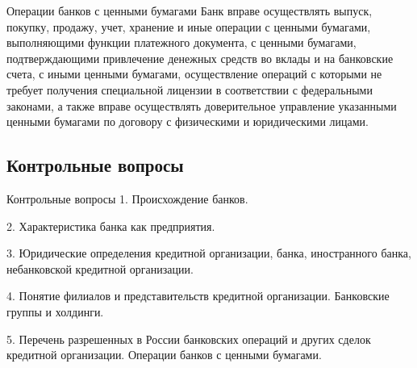 \documentclass[_Banking_p1.tex]{subfiles}
\begin{document}
\begin{frame}{Операции банков с ценными бумагами}
Банк вправе осуществлять выпуск, покупку, продажу, учет, хранение и иные операции с ценными бумагами, выполняющими функции платежного документа, с ценными бумагами, подтверждающими привлечение денежных средств во вклады и на банковские счета, с иными ценными бумагами, осуществление операций с которыми не требует получения специальной лицензии в соответствии с федеральными законами, а также вправе осуществлять доверительное управление указанными ценными бумагами по договору с физическими и юридическими лицами.

\end{frame}
\subsection{Контрольные вопросы}
\begin{frame}{Контрольные вопросы}
1. Происхождение банков.

2. Характеристика банка как предприятия.

3. Юридические определения кредитной организации, банка, иностранного банка, небанковской кредитной организации.

4. Понятие филиалов и представительств кредитной организации. Банковские группы и холдинги.

5. Перечень разрешенных в России банковских операций и других сделок кредитной организации. Операции банков с ценными бумагами.

\end{frame}

\end{document}
